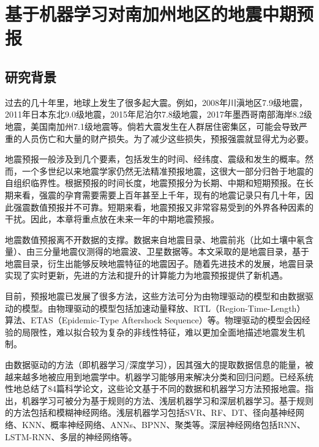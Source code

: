 \chapter{基于机器学习对南加州地区的地震中期预报}\label{chap:ml_seismic}

\section{研究背景}\label{sec:seism_introduction}

过去的几十年里，地球上发生了很多起大震。例如，2008年川滇地区7.9级地震，2011年日本东北9.0级地震，2015年尼泊尔7.8级地震，2017年墨西哥南部海岸8.2级地震，美国南加州7.1级地震等。倘若大震发生在人群居住密集区，可能会导致严重的人员伤亡和大量的财产损失。为了减少这些损失，预报强震就显得尤为必要。

地震预报一般涉及到几个要素，包括发生的时间、经纬度、震级和发生的概率\citep{Allen1976Responsibilities}。然而，一个多世纪以来地震学家仍然无法精准预报地震，这很大一部分归咎于地震的自组织临界性\citep{Geller2007Earthquake}。根据预报的时间长度，地震预报分为长期、中期和短期预报\citep{Zhang2002An,Pulinets2018What}。在长期来看，强震的孕育需要需要上百年甚至上千年，现有的地震记录只有几十年，因此强震数值预报并不可靠。短期来看，地震预报又非常容易受到的外界各种因素的干扰。因此，本章将重点放在未来一年的中期地震预报。

地震数值预报离不开数据的支撑。数据来自地震目录、地震前兆（比如土壤中氡含量）、由三分量地震仪测得的地震波、卫星数据等\citep{al2020application}。本文采取的是地震目录，基于地震目录，衍生出能够反映地震特征的地震因子。随着先进技术的发展，地震目录实现了实时更新，先进的方法和提升的计算能力为地震预报提供了新机遇。

目前，预报地震已发展了很多方法，这些方法可分为由物理驱动的模型和由数据驱动的模型。由物理驱动的模型包括加速动量释放\citep{Ben2002Accelerated}、RTL（Region-Time-Length）算法\citep{Sobolev2007On}、ETAS（Epidemic-Type Aftershock Sequence）\citep{Ogata1986Statistical}等。物理驱动的模型会因经验的局限性，难以拟合较为复杂的非线性特征，难以更加全面地描述地震发生机制。

由数据驱动的方法（即机器学习/深度学习），因其强大的提取数据信息的能量，被越来越多地被应用到地震学中\citep{Alves2006Earthquake,Madahizadeh2009prediction,Panakkat2007Neural,Sunkara2009Model}。机器学习能够用来解决分类和回归问题。\citet{al2020application}已经系统性地总结了84篇科学论文，这些论文基于不同的数据和机器学习方法预报地震。\citet{al2020application}指出，机器学习可被分为基于规则的方法、浅层机器学习和深层机器学习。基于规则的方法包括\citep{zhong2010prediction,zamani2013application,mirrashid2014earthquake}和模糊神经网络\citep{Lopez2019Evolutionary}。浅层机器学习包括SVR\citep{asencio2017temporal}、RF\citep{asim2017earthquake}、DT\citep{asencio2017temporal}、径向基神经网络\citep{Alexandridis2014Large}、KNN\citep{Panakkat2007Neural,asencio2017temporal}、概率神经网络\citep{Adeli2009A}、ANNs\citep{morales2013earthquake,asencio2017temporal}、BPNN\citep{Panakkat2007Neural,Narayanakumar2016A}、聚类\citep{shodiq2018neural}等。深层神经网络包括RNN\citep{Panakkat2009Recurrent,asim2017earthquake}、LSTM-RNN\citep{Wang2017Earthquake,Bhatia2018EARTHQUAKE,berhich2020lstm}、多层的神经网络\citep{huang2018large}等。

